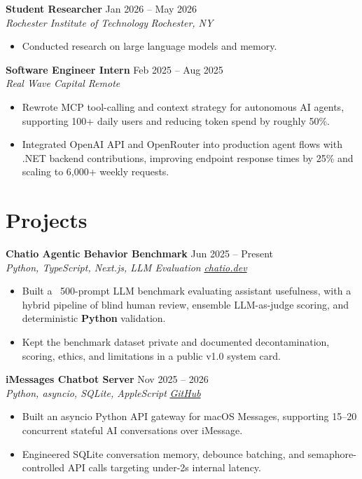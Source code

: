 \documentclass[10pt,letterpaper]{article}
\newif\ifresumeFirstRole
\newcommand{\resumeRole}[4]{%
  \ifresumeFirstRole
    \global\resumeFirstRolefalse
  \else
    \vspace{0pt plus 1fill}%
  \fi
  \textbf{#1} \hfill #2\\
  \textit{#3} \hfill \textit{#4}
}
\begin{document}
\resumeRole{Student Researcher}{Jan 2026 -- May 2026}{Rochester Institute of Technology}{Rochester, NY}
\begin{itemize}
  \item Conducted research on large language models and memory.
\end{itemize}

\resumeRole{Software Engineer Intern}{Feb 2025 -- Aug 2025}{Real Wave Capital}{Remote}
\begin{itemize}
  \item Rewrote MCP tool-calling and context strategy for autonomous AI agents, supporting 100+ daily users and reducing token spend by roughly 50\%.
  \item Integrated OpenAI API and OpenRouter into production agent flows with .NET backend contributions, improving endpoint response times by 25\% and scaling to 6,000+ weekly requests.
\end{itemize}

\section*{Projects}
\resumeRole{Chatio Agentic Behavior Benchmark}{Jun 2025 -- Present}{Python, TypeScript, Next.js, LLM Evaluation}{\href{https://chatio.dev}{chatio.dev}}
\begin{itemize}
  \item Built a ~500-prompt LLM benchmark evaluating assistant usefulness, with a hybrid pipeline of blind human review, ensemble LLM-as-judge scoring, and deterministic \textbf{Python} validation.
  \item Kept the benchmark dataset private and documented decontamination, scoring, ethics, and limitations in a public v1.0 system card.
\end{itemize}

\resumeRole{iMessages Chatbot Server}{Nov 2025 -- 2026}{Python, asyncio, SQLite, AppleScript}{\href{https://github.com/alextyhwang/iMessages-Chatbot-Server}{GitHub}}
\begin{itemize}
  \item Built an asyncio Python API gateway for macOS Messages, supporting 15--20 concurrent stateful AI conversations over iMessage.
  \item Engineered SQLite conversation memory, debounce batching, and semaphore-controlled API calls targeting under-2s internal latency.
\end{itemize}
\end{document}
